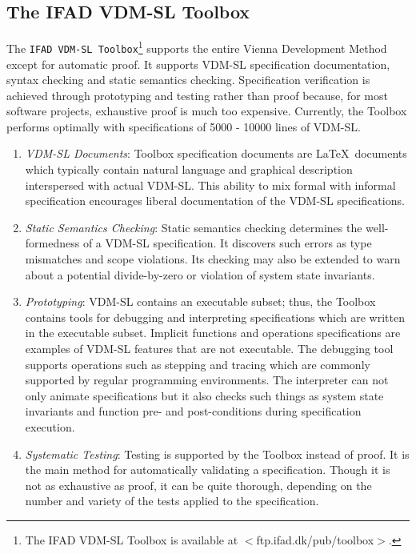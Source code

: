 \documentclass[11pt]{article}
\begin{document}
\subsection{The IFAD VDM-SL Toolbox}
The {\tt IFAD VDM-SL Toolbox}\footnote{The IFAD VDM-SL Toolbox is available at $<$ftp.ifad.dk/pub/toolbox$>$.} supports the entire Vienna Development Method except for automatic proof.  It supports VDM-SL specification documentation, syntax checking and static semantics checking.  Specification verification is achieved through prototyping and testing rather than proof because, for most software projects, exhaustive proof is much too expensive.  Currently, the Toolbox performs optimally with specifications of 5000 - 10000 lines of VDM-SL.
\begin{enumerate}
\item {\it VDM-SL Documents}: Toolbox specification documents are \LaTeX\ documents which typically contain natural language and graphical description interspersed with actual VDM-SL.  This ability to mix formal with informal specification encourages liberal documentation of the VDM-SL specifications.
\item {\it Static Semantics Checking}: Static semantics checking determines the well-formedness of a VDM-SL specification.  It discovers such errors as type mismatches and scope violations.  Its checking may also be extended to warn about a potential divide-by-zero or violation of system state invariants.
\item {\it Prototyping}:  VDM-SL contains an executable subset; thus, the Toolbox contains tools for debugging and interpreting specifications which are written in the executable subset.  Implicit functions and operations specifications are examples of VDM-SL features that are not executable.  The debugging tool supports operations such as stepping and tracing which are commonly supported by regular programming environments.  The interpreter can not only animate specifications but it also checks such things as system state invariants and function pre- and post-conditions during specification execution.
\item {\it Systematic Testing}:  Testing is supported by the Toolbox instead of proof.  It is the main method for automatically validating a specification.  Though it is not as exhaustive as proof, it can be quite thorough, depending on the number and variety of the tests applied to the specification.  \\


\end{enumerate}
\end{document}
